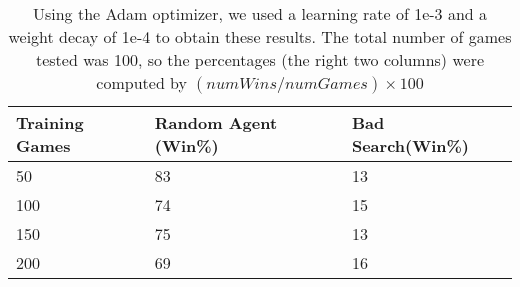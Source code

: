 \begin{table}
\begin{tabular}{@{}p{}|p{}|p{}}
\hline
Training Games & Random Agent (Win\%) & Bad Search(Win\%)\\
\hline
50 & 83 & 13 \\
\hline
100 & 74 & 15\\
\hline
150 & 75 & 13\\
\hline
200 & 69 & 16\\
\end{tabular}
\vspace{2pt}
\caption{ Using the Adam optimizer, we used a learning rate of 1e-3 and a weight decay of 1e-4 to obtain these results. The total number of games tested was 100, so the percentages (the right two columns) were computed by $(numWins/numGames)\times 100$ }
\label{tab:results}
\end{table}
